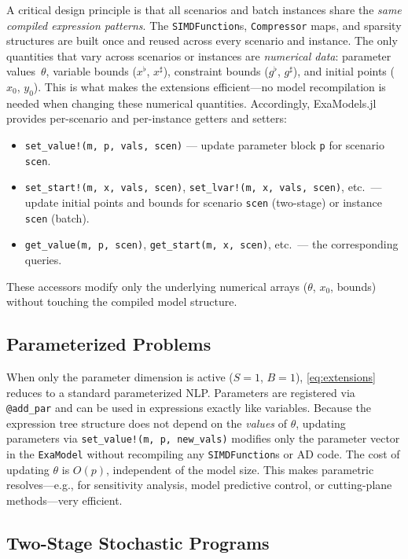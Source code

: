 \documentclass[11pt]{article}
\begin{document}
A critical design principle is that all scenarios and batch instances share the \emph{same compiled expression patterns}. The \texttt{SIMDFunction}s, \texttt{Compressor} maps, and sparsity structures are built once and reused across every scenario and instance. The only quantities that vary across scenarios or instances are \emph{numerical data}: parameter values~$\theta$, variable bounds ($x^\flat$, $x^\sharp$), constraint bounds ($g^\flat$, $g^\sharp$), and initial points ($x_0$, $y_0$). This is what makes the extensions efficient---no model recompilation is needed when changing these numerical quantities. Accordingly, ExaModels.jl provides per-scenario and per-instance getters and setters:
\begin{itemize}
  \item \texttt{set\_value!(m, p, vals, scen)} --- update parameter block \texttt{p} for scenario \texttt{scen}.
  \item \texttt{set\_start!(m, x, vals, scen)}, \texttt{set\_lvar!(m, x, vals, scen)}, etc.\ --- update initial points and bounds for scenario \texttt{scen} (two-stage) or instance \texttt{scen} (batch).
  \item \texttt{get\_value(m, p, scen)}, \texttt{get\_start(m, x, scen)}, etc.\ --- the corresponding queries.
\end{itemize}
These accessors modify only the underlying numerical arrays ($\theta$, $x_0$, bounds) without touching the compiled model structure.

\subsection{Parameterized Problems}
\label{sec:extensions:parameters}

When only the parameter dimension is active ($S = 1$, $B = 1$), \cref{eq:extensions} reduces to a standard parameterized NLP. Parameters are registered via \texttt{@add\_par} and can be used in expressions exactly like variables. Because the expression tree structure does not depend on the \emph{values} of $\theta$, updating parameters via \texttt{set\_value!(m, p, new\_vals)} modifies only the parameter vector in the \texttt{ExaModel} without recompiling any \texttt{SIMDFunction}s or AD code. The cost of updating $\theta$ is $O(p)$, independent of the model size. This makes parametric resolves---e.g., for sensitivity analysis, model predictive control, or cutting-plane methods---very efficient.

\subsection{Two-Stage Stochastic Programs}
\label{sec:extensions:twostage}
\end{document}

